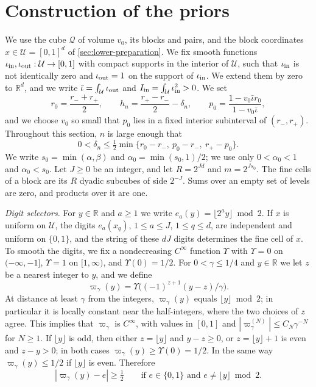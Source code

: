 \section{Construction of the priors}\label{lat:sec-construction}
\label{sec:block-phases}

We use the cube $\mathcal Q$ of volume $v_0$, its blocks and pairs, and
the block coordinates $x\in\mathcal U=[0,1]^d$ of
\cref{sec:lower-preparation}. We fix smooth functions
$\iota_{\rm in},\iota_{\rm out}:\mathcal U\to[0,1]$ with compact
supports in the interior of $\mathcal U$, such that $\iota_{\rm in}$ is
not identically zero and $\iota_{\rm out}=1$ on the support of
$\iota_{\rm in}$. We extend them by zero to $\mathbb R^d$, and we write
$\bar\iota=\int_{\mathcal U}\iota_{\rm out}$ and
$I_{\rm in}=\int_{\mathcal U}\iota_{\rm in}^2>0$. We set
\[
 r_0=\frac{r_-+r_+}2,\qquad h_n=\frac{r_+-r_-}2-\delta_n,\qquad
 p_0=\frac{1-v_0\bar\iota r_0}{1-v_0\bar\iota},
\]
and we choose $v_0$ so small that $p_0$ lies in a fixed interior
subinterval of $(r_-,r_+)$. Throughout this section, $n$ is large
enough that
\[
 0<\delta_n\le\tfrac12\min\{r_0-r_-,\ p_0-r_-,\ r_+-p_0\}.
\]
We write $s_0=\min(\alpha,\beta)$ and $\alpha_0=\min(s_0,1)/2$; we use
only $0<\alpha_0<1$ and $\alpha_0<s_0$. Let $J\ge0$ be an integer, and
let $R=2^{Jd}$ and $m=2^{Js_0}$. The fine cells of a block are its $R$
dyadic subcubes of side $2^{-J}$. Sums over an empty set of levels are
zero, and products over it are one.

\emph{Digit selectors.} For $y\in\mathbb R$ and $a\ge1$ we write
$e_a(y)=\lfloor2^ay\rfloor\bmod2$. If $x$ is uniform on $\mathcal U$,
the digits $e_a(x_q)$, $1\le a\le J$, $1\le q\le d$, are independent and
uniform on $\{0,1\}$, and the string of these $dJ$ digits determines the
fine cell of $x$. To smooth the digits, we fix a nondecreasing
$C^\infty$ function $\Upsilon$ with $\Upsilon=0$ on $(-\infty,-1]$,
$\Upsilon=1$ on $[1,\infty)$, and $\Upsilon(0)=1/2$. For
$0<\gamma\le1/4$ and $y\in\mathbb R$ we let $z$ be a nearest integer to
$y$, and we define
\[
 \varpi_\gamma(y)=\Upsilon\bigl((-1)^{z+1}(y-z)/\gamma\bigr).
\]
At distance at least $\gamma$ from the integers, $\varpi_\gamma(y)$
equals $\lfloor y\rfloor\bmod2$; in particular it is locally constant
near the half-integers, where the two choices of $z$ agree. This
implies that $\varpi_\gamma$ is $C^\infty$, with values in $[0,1]$ and
$|\varpi_\gamma^{(N)}|\le C_N\gamma^{-N}$ for $N\ge1$. If
$\lfloor y\rfloor$ is odd, then either $z=\lfloor y\rfloor$ and
$y-z\ge0$, or $z=\lfloor y\rfloor+1$ is even and $z-y>0$; in both cases
$\varpi_\gamma(y)\ge\Upsilon(0)=1/2$. In the same way
$\varpi_\gamma(y)\le1/2$ if $\lfloor y\rfloor$ is even. Therefore
\begin{equation}\label{lat:soft-digit}
 |\varpi_\gamma(y)-e|\ge\tfrac12\qquad
 \text{if }e\in\{0,1\}\text{ and }e\ne\lfloor y\rfloor\bmod2 .
\end{equation}

